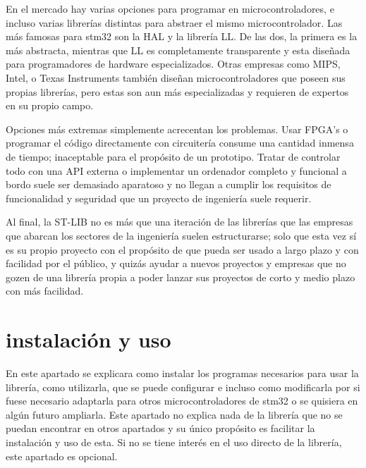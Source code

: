 \documentclass{report}
\begin{document}
En el mercado hay varias opciones para programar en microcontroladores, e incluso varias librerías distintas para abstraer el mismo microcontrolador. Las más famosas para stm32 son la HAL y la librería LL. De las dos, la primera es la más abstracta, mientras que LL es completamente transparente y esta diseñada para programadores de hardware especializados. Otras empresas como MIPS, Intel, o Texas Instruments también diseñan microcontroladores que poseen sus propias librerías, pero estas son aun más especializadas y requieren de expertos en su propio campo. \par
Opciones más extremas simplemente acrecentan los problemas. Usar FPGA's o programar el código directamente con circuitería consume una cantidad inmensa de tiempo; inaceptable para el propósito de un prototipo. Tratar de controlar todo con una API externa o implementar un ordenador completo y funcional a bordo suele ser demasiado aparatoso y no llegan a cumplir los requisitos de funcionalidad y seguridad que un proyecto de ingeniería suele requerir. \par \vspace{0.3cm}
Al final, la ST-LIB no es más que una iteración de las librerías que las empresas que abarcan los sectores de la ingeniería suelen estructurarse; solo que esta vez sí es su propio proyecto con el propósito de que pueda ser usado a largo plazo y con facilidad por el público, y quizás ayudar a nuevos proyectos y empresas que no gozen de una librería propia a poder lanzar sus proyectos de corto y medio plazo con más facilidad. 

\newpage

\section{instalación y uso}
En este apartado se explicara como instalar los programas necesarios para usar la librería, como utilizarla, que se puede configurar e incluso como modificarla por si fuese necesario adaptarla para otros microcontroladores de stm32 o se quisiera en algún futuro ampliarla. Este apartado no explica nada de la librería que no se puedan encontrar en otros apartados y su único propósito es facilitar la instalación y uso de esta. Si no se tiene interés en el uso directo de la librería, este apartado es opcional. 
\end{document}
